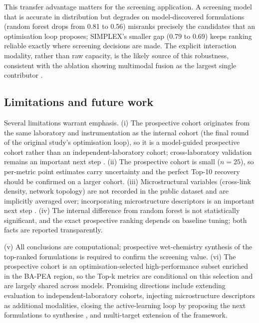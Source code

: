 \documentclass[utf8]{FrontiersinHarvard}
\begin{document}
This transfer advantage matters for the screening application. A screening model that is accurate in distribution but degrades on model-discovered formulations (random forest drops from 0.81 to 0.56) misranks precisely the candidates that an optimisation loop proposes; SIMPLEX's smaller gap (0.79 to 0.69) keeps ranking reliable exactly where screening decisions are made. The explicit interaction modality, rather than raw capacity, is the likely source of this robustness, consistent with the ablation showing multimodal fusion as the largest single contributor \cite{kim2023smallML,agrawal2016mlmaterials,isayev2017mlmaterials,ward2018mlcomposite}.

\subsection{Limitations and future work}

Several limitations warrant emphasis. (i) The prospective cohort originates from the same laboratory and instrumentation as the internal cohort (the final round of the original study's optimisation loop), so it is a model-guided prospective cohort rather than an independent-laboratory cohort; cross-laboratory validation remains an important next step \cite{liao2025nature}. (ii) The prospective cohort is small ($n = 25$), so per-metric point estimates carry uncertainty and the perfect Top-10 recovery should be confirmed on a larger cohort. (iii) Microstructural variables (cross-link density, network topology) are not recorded in the public dataset and are implicitly averaged over; incorporating microstructure descriptors is an important next step \cite{kim2023smallML,agrawal2016mlmaterials,isayev2017mlmaterials,zitnick2020materials}. (iv) The internal difference from random forest is not statistically significant, and the exact prospective ranking depends on baseline tuning; both facts are reported transparently.

(v) All conclusions are computational; prospective wet-chemistry synthesis of the top-ranked formulations is required to confirm the screening value. (vi) The prospective cohort is an optimisation-selected high-performance subset enriched in the BA-PEA region, so the Top-k metrics are conditional on this selection and are largely shared across models. Promising directions include extending evaluation to independent-laboratory cohorts, injecting microstructure descriptors as additional modalities, closing the active-learning loop by proposing the next formulations to synthesise \cite{chen2022activelearning}, and multi-target extension of the framework.
\end{document}

